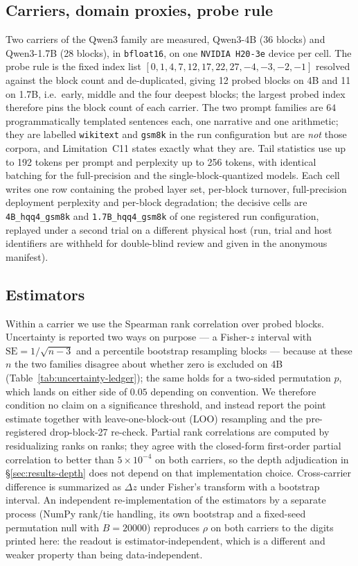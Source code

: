 \documentclass{article}
\begin{document}
\subsection{Carriers, domain proxies, probe rule}
\label{sec:method-carriers}
Two carriers of the Qwen3 family \citep{yang2025qwen3} are measured, Qwen3-4B (36 blocks) and
Qwen3-1.7B (28 blocks), in \texttt{bfloat16}, on one \texttt{NVIDIA H20-3e} device per cell. The
probe rule is the fixed index list $[0,1,4,7,12,17,22,27,-4,-3,-2,-1]$ resolved against the block
count and de-duplicated, giving 12 probed blocks on 4B and 11 on 1.7B, i.e.\ early, middle and
the four deepest blocks; the largest probed index therefore pins the block count of each carrier.
The two prompt families are $64$ programmatically templated sentences each, one narrative and one
arithmetic; they are labelled \texttt{wikitext} and \texttt{gsm8k} in the run configuration but
are \emph{not} those corpora, and Limitation~C11 states exactly what they are. Tail statistics use
up to 192 tokens per prompt and perplexity up to 256 tokens, with identical batching for the
full-precision and the single-block-quantized models. Each cell writes one row containing the
probed layer set, per-block turnover, full-precision deployment perplexity and per-block
degradation; the decisive cells are \texttt{4B\_hqq4\_gsm8k} and \texttt{1.7B\_hqq4\_gsm8k} of
one registered run configuration, replayed under a second trial on a different physical host
(run, trial and host identifiers are withheld for double-blind review and given in the anonymous
manifest).

\subsection{Estimators}
\label{sec:method-stat}
Within a carrier we use the Spearman rank correlation over probed blocks. Uncertainty is reported
two ways on purpose --- a Fisher-$z$ interval with $\mathrm{SE}=1/\sqrt{n-3}$ and a percentile
bootstrap resampling blocks --- because at these $n$ the two families disagree about whether zero
is excluded on 4B (Table~\ref{tab:uncertainty-ledger}); the same holds for a two-sided
permutation $p$, which lands on either side of $0.05$ depending on convention. We therefore
condition no claim on a significance threshold, and instead report the point estimate together
with leave-one-block-out (LOO) resampling and the pre-registered drop-block-27 re-check.
Partial rank correlations are computed by residualizing ranks on ranks; they agree with the
closed-form first-order partial correlation to better than $5\times10^{-4}$ on both carriers,
so the depth adjudication in \S\ref{sec:results-depth} does not depend on that implementation
choice. Cross-carrier difference is summarized as $\Delta z$ under Fisher's transform with a
bootstrap interval. An independent re-implementation of the estimators by a separate process
(NumPy rank/tie handling, its own bootstrap and a fixed-seed permutation null with $B{=}20000$)
reproduces $\rho$ on both carriers to the digits printed here: the readout is
estimator-independent, which is a different and weaker property than being data-independent.
\end{document}
